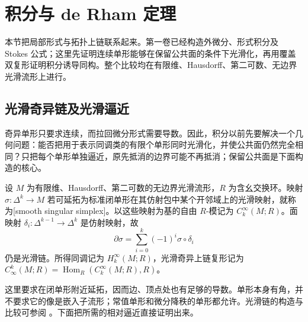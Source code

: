
% 
% 

\section{积分与 de Rham 定理}
\label{g2:sec:0703}

本节把局部形式与拓扑上链联系起来。第一卷已经构造外微分、形式积分及 Stokes 公式；这里先证明连续单形能够在保留公共面的条件下光滑化，再用覆盖双复形证明积分诱导同构。整个比较均在有限维、Hausdorff、第二可数、无边界光滑流形上进行。

\subsection{光滑奇异链及光滑逼近}
\label{g2:subsec:0703:01}
奇异单形只要求连续，而拉回微分形式需要导数。因此，积分以前先要解决一个几何问题：能否把用于表示同调类的有限个单形同时光滑化，并使公共面仍然完全相同？只把每个单形单独逼近，原先抵消的边界可能不再抵消；保留公共面是下面构造的核心。

\begin{definition}\label{g2:def:smooth-singular-chain}
	设 \(M\) 为有限维、Hausdorff、第二可数的无边界光滑流形，\(R\) 为含幺交换环。映射 \(\sigma:\Delta^k\to M\) 若可延拓为标准闭单形在其仿射包中某个开邻域上的光滑映射，就称为[smooth singular simplex]。以这些映射为基的自由 \(R\)-模记为 \(C_k^\infty(M;R)\)。面映射 \(\delta_i:\Delta^{k-1}\to\Delta^k\) 是仿射映射，故
	\[
		\partial\sigma=\sum_{i=0}^k(-1)^i\sigma\circ\delta_i
	\]
	仍是光滑链。所得同调记为 \(H_k^\infty(M;R)\)，光滑奇异上链复形记为 \(C_\infty^k(M;R)=\operatorname{Hom}_R(C_k^\infty(M;R),R)\)。
\end{definition}

这里要求在闭单形附近延拓，因而边、顶点处也有足够的导数。单形本身有角，并不要求它的像是嵌入子流形；常值单形和微分降秩的单形都允许。光滑链的构造与比较可参阅 \cite[第18章，Smooth Singular Homology]{Lee2012Smooth}。下面把所需的相对逼近直接证明出来。

